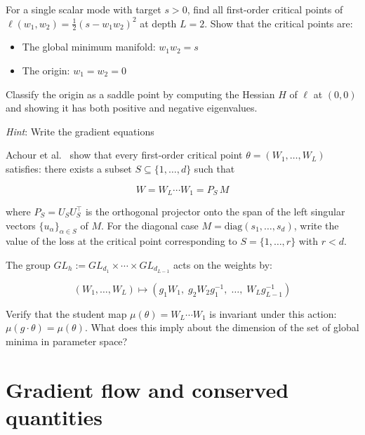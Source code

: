 \documentclass[11pt]{article}
\providecommand{\tightlist}{%
  \setlength{\itemsep}{0pt}\setlength{\parskip}{0pt}}
\begin{document}
\begin{exercise}
\label{ex:td-1b}
For a single scalar mode with target \(s > 0\), find all
first-order critical points of
\(\ell(w_1, w_2) = \frac{1}{2}(s - w_1 w_2)^2\) at depth \(L = 2\). Show
that the critical points are:

\begin{itemize}
\tightlist
\item
  The global minimum manifold: \(w_1 w_2 = s\)
\item
  The origin: \(w_1 = w_2 = 0\)
\end{itemize}

Classify the origin as a saddle point by computing the Hessian \(H\) of
\(\ell\) at \((0,0)\) and showing it has both positive and negative
eigenvalues.

\emph{Hint}: Write the gradient equations
\end{exercise}


\begin{exercise}
\label{ex:td-1c}
Achour et al.~\cite{achour2024} show that every
first-order critical point \(\theta = (W_1, \ldots, W_L)\) satisfies:
there exists a subset \(S \subseteq \{1, \ldots, d\}\) such that

\[W = W_L \cdots W_1 = P_S\, M\]

where \(P_S = U_S U_S^\top\) is the orthogonal projector onto the span
of the left singular vectors \(\{u_\alpha\}_{\alpha \in S}\) of \(M\).
For the diagonal case \(M = \text{diag}(s_1, \ldots, s_d)\), write the
value of the loss at the critical point corresponding to
\(S = \{1, \ldots, r\}\) with \(r < d\).
\end{exercise}


\begin{exercise}
\label{ex:td-1d}
The group
\(GL_h := GL_{d_1} \times \cdots \times GL_{d_{L-1}}\) acts on the
weights by:

\[(W_1, \ldots, W_L) \mapsto (g_1 W_1,\; g_2 W_2 g_1^{-1},\; \ldots,\; W_L g_{L-1}^{-1})\]

Verify that the student map \(\mu(\theta) = W_L \cdots W_1\) is
invariant under this action: \(\mu(g \cdot \theta) = \mu(\theta)\). What
does this imply about the dimension of the set of global minima in
parameter space?
\end{exercise}


\section{Gradient flow and conserved quantities}
\label{sec:td-gradflow}
\end{document}
